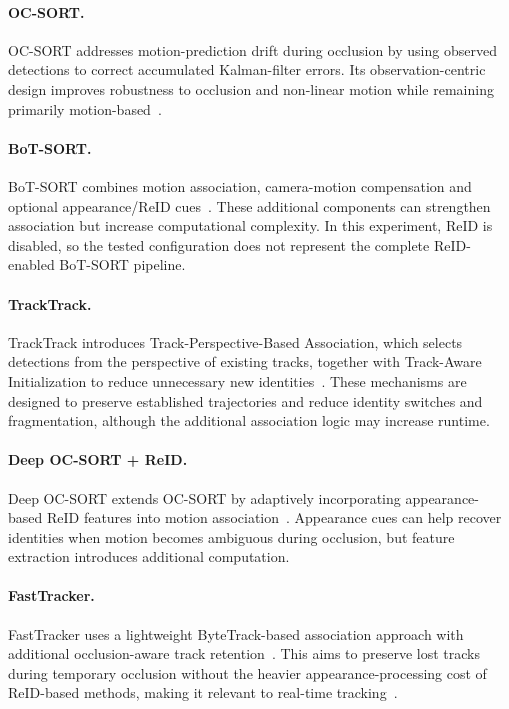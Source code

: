 \documentclass[11pt,a4paper]{article}
\begin{document}
\paragraph{OC-SORT.} OC-SORT addresses motion-prediction drift during occlusion by using observed detections to correct accumulated Kalman-filter errors. Its observation-centric design improves robustness to occlusion and non-linear motion while remaining primarily motion-based~\cite{cao2023ocsort}.

\paragraph{BoT-SORT.} BoT-SORT combines motion association, camera-motion compensation and optional appearance/ReID cues~\cite{aharon2022botsort}. These additional components can strengthen association but increase computational complexity. In this experiment, ReID is disabled, so the tested configuration does not represent the complete ReID-enabled BoT-SORT pipeline.

\paragraph{TrackTrack.} TrackTrack introduces Track-Perspective-Based Association, which selects detections from the perspective of existing tracks, together with Track-Aware Initialization to reduce unnecessary new identities~\cite{shim2025tracktrack}. These mechanisms are designed to preserve established trajectories and reduce identity switches and fragmentation, although the additional association logic may increase runtime.

\paragraph{Deep OC-SORT + ReID.} Deep OC-SORT extends OC-SORT by adaptively incorporating appearance-based ReID features into motion association~\cite{maggiolino2023deepocsort}. Appearance cues can help recover identities when motion becomes ambiguous during occlusion, but feature extraction introduces additional computation.

\paragraph{FastTracker.} FastTracker uses a lightweight ByteTrack-based association approach with additional occlusion-aware track retention~\cite{hashempoor2025fasttracker}. This aims to preserve lost tracks during temporary occlusion without the heavier appearance-processing cost of ReID-based methods, making it relevant to real-time tracking~\cite{ultralytics_track}.
\end{document}
